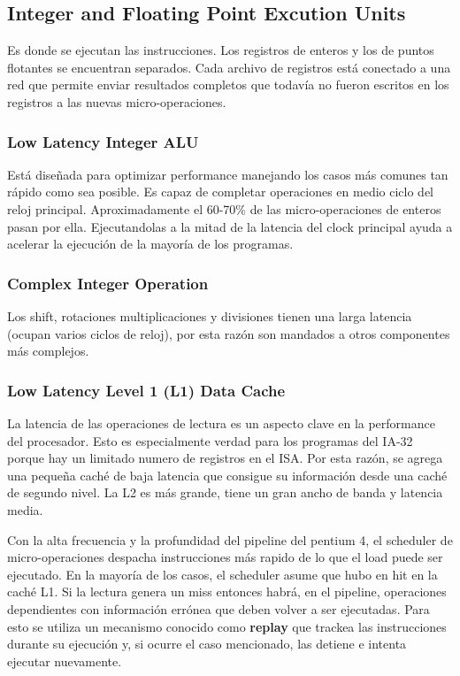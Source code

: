 \subsection{Integer and Floating Point Excution Units}
Es donde se ejecutan las instrucciones.
Los registros de enteros y los de puntos flotantes se encuentran separados. Cada archivo de registros está conectado a una red que permite enviar resultados completos que todavía no fueron escritos en los registros a las nuevas micro-operaciones.

\subsubsection*{Low Latency Integer ALU}
Está diseñada para optimizar performance manejando los casos más comunes tan rápido como sea posible. Es capaz de completar operaciones en medio ciclo del reloj principal. Aproximadamente el 60-70\% de las micro-operaciones de enteros pasan por ella. Ejecutandolas a la mitad de la latencia del clock principal ayuda a acelerar la ejecución de la mayoría de los programas.

\subsubsection*{Complex Integer Operation}
Los shift, rotaciones multiplicaciones y divisiones tienen una larga latencia (ocupan varios ciclos de reloj), por esta razón son mandados a otros componentes más complejos. 

\subsubsection*{Low Latency Level 1 (L1) Data Cache}
La latencia de las operaciones de lectura es un aspecto clave en la performance del procesador. Esto es especialmente verdad para los programas del IA-32 porque hay un limitado numero de registros en el ISA. Por esta razón, se agrega una pequeña caché de baja latencia que consigue su información desde una caché de segundo nivel. La L2 es más grande, tiene un gran ancho de banda y latencia media.

Con la alta frecuencia y la profundidad del pipeline del pentium 4, el scheduler de micro-operaciones despacha instrucciones más rapido de lo que el load puede ser ejecutado. En la mayoría de los casos, el scheduler asume que hubo en hit en la caché L1. Si la lectura genera un miss entonces habrá, en el pipeline, operaciones dependientes con información errónea que deben volver a ser ejecutadas. Para esto se utiliza un mecanismo conocido como \textbf{replay} que trackea las instrucciones durante su ejecución y, si ocurre el caso mencionado, las detiene e intenta ejecutar nuevamente. 

